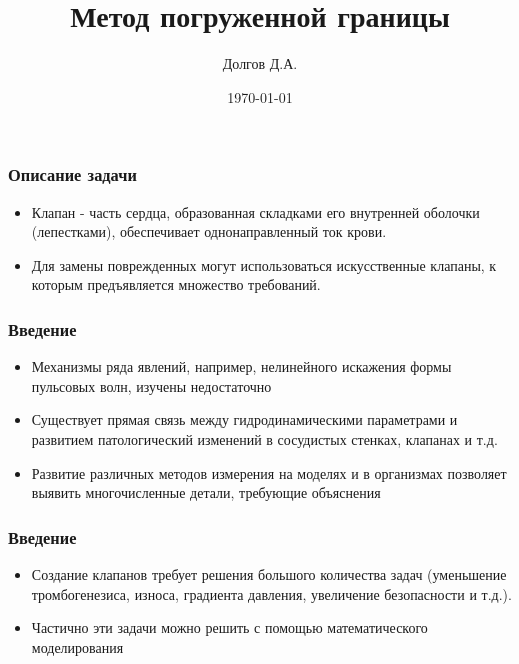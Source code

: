 \documentclass[14pt]{beamer}
\title{Метод погруженной границы}
\date{\today}
\author{Долгов Д.А.}
\institute{Кемеровский Государственный Университет \\
    \vspace{0.7cm}
    \vspace{0.7cm}
}
\begin{document}
\maketitle

\begin{frame}
\frametitle{Описание задачи}
\begin{itemize}
	\item Клапан - часть сердца, образованная складками его внутренней оболочки (лепестками), обеспечивает однонаправленный ток крови.
	\item Для замены поврежденных могут использоваться искусственные клапаны, к которым предъявляется множество требований.
\end{itemize}
\end{frame}

\begin{frame}
\frametitle{Введение}
\begin{itemize}
    \item \alert<+>{Механизмы ряда явлений, например, нелинейного искажения формы пульсовых волн, изучены недостаточно}
    \item \alert<+>{Существует прямая связь между гидродинамическими параметрами и развитием патологический изменений в сосудистых стенках, клапанах и т.д.}
    \item \alert<+>{Развитие различных методов измерения на моделях и в организмах позволяет выявить многочисленные детали, требующие объяснения}
\end{itemize}
\end{frame}

\begin{frame}
\frametitle{Введение}
\begin{itemize}
	\item Создание клапанов требует решения большого количества задач (уменьшение тромбогенезиса, износа, градиента давления, увеличение безопасности и т.д.).
    \item Частично эти задачи можно решить с помощью математического моделирования
\end{itemize}
\end{frame}
\end{document}
